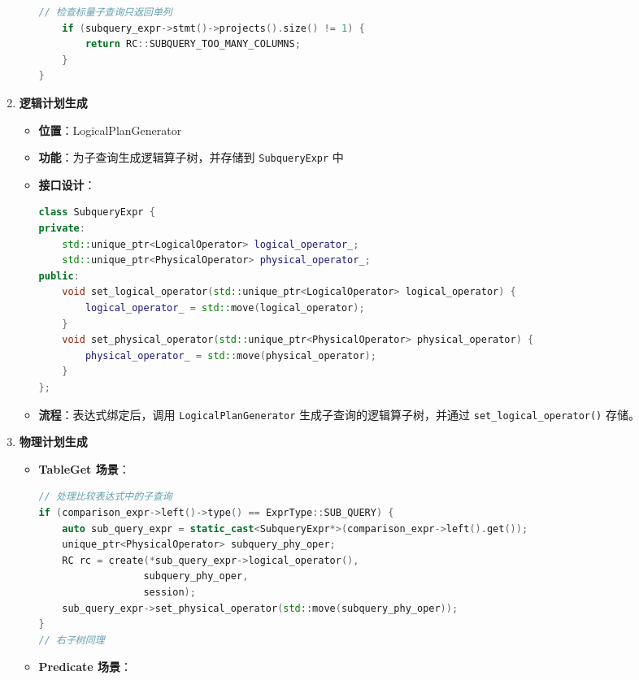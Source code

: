 \documentclass[a4paper, 12pt]{article}
\begin{document}
\begin{enumerate}
\begin{itemize}
\begin{lstlisting}[language=C++]
    // 检查标量子查询只返回单列
    if (subquery_expr->stmt()->projects().size() != 1) {
        return RC::SUBQUERY_TOO_MANY_COLUMNS;
    }
}
        \end{lstlisting}
    \end{itemize}

    \item \textbf{逻辑计划生成}
    
\begin{itemize}
        \item \textbf{位置}：LogicalPlanGenerator
        \item \textbf{功能}：为子查询生成逻辑算子树，并存储到 \texttt{SubqueryExpr} 中
        \item \textbf{接口设计}：
        \begin{lstlisting}[language=C++]
class SubqueryExpr {
private:
    std::unique_ptr<LogicalOperator> logical_operator_;
    std::unique_ptr<PhysicalOperator> physical_operator_;
public:
    void set_logical_operator(std::unique_ptr<LogicalOperator> logical_operator) {
        logical_operator_ = std::move(logical_operator);
    }
    void set_physical_operator(std::unique_ptr<PhysicalOperator> physical_operator) {
        physical_operator_ = std::move(physical_operator);
    }
};
        \end{lstlisting}
        \item \textbf{流程}：表达式绑定后，调用 \texttt{LogicalPlanGenerator} 生成子查询的逻辑算子树，并通过 \texttt{set\_logical\_operator()} 存储。
    \end{itemize}

    \item \textbf{物理计划生成}
    
\begin{itemize}
        \item \textbf{TableGet 场景}：
        \begin{lstlisting}[language=C++]
// 处理比较表达式中的子查询
if (comparison_expr->left()->type() == ExprType::SUB_QUERY) {
    auto sub_query_expr = static_cast<SubqueryExpr*>(comparison_expr->left().get());
    unique_ptr<PhysicalOperator> subquery_phy_oper;
    RC rc = create(*sub_query_expr->logical_operator(), 
                  subquery_phy_oper, 
                  session);
    sub_query_expr->set_physical_operator(std::move(subquery_phy_oper));
}
// 右子树同理
        \end{lstlisting}
        
        \item \textbf{Predicate 场景}：
        

\end{itemize}
\end{enumerate}
\end{document}
